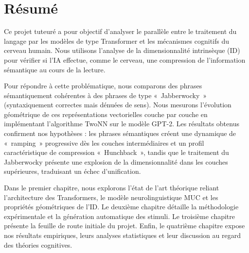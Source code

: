 \chapter*{Résumé}

Ce projet tuteuré a pour objectif d'analyser le parallèle entre le traitement du langage par les modèles de type Transformer et les mécanismes cognitifs du cerveau humain. Nous utilisons l'analyse de la dimensionnalité intrinsèque (ID) pour vérifier si l'IA effectue, comme le cerveau, une compression de l'information sémantique au cours de la lecture.

Pour répondre à cette problématique, nous comparons des phrases sémantiquement cohérentes à des phrases de type «~Jabberwocky~» (syntaxiquement correctes mais dénuées de sens). Nous mesurons l'évolution géométrique de ces représentations vectorielles couche par couche en implémentant l'algorithme TwoNN sur le modèle GPT-2. Les résultats obtenus confirment nos hypothèses : les phrases sémantiques créent une dynamique de «~ramping~» progressive dès les couches intermédiaires et un profil caractéristique de compression «~Hunchback~», tandis que le traitement du Jabberwocky présente une explosion de la dimensionnalité dans les couches supérieures, traduisant un échec d'unification.

Dans le premier chapitre, nous explorons l'état de l'art théorique reliant l'architecture des Transformers, le modèle neurolinguistique MUC et les propriétés géométriques de l'ID. Le deuxième chapitre détaille la méthodologie expérimentale et la génération automatique des stimuli. Le troisième chapitre présente la feuille de route initiale du projet. Enfin, le quatrième chapitre expose nos résultats empiriques, leurs analyses statistiques et leur discussion au regard des théories cognitives.